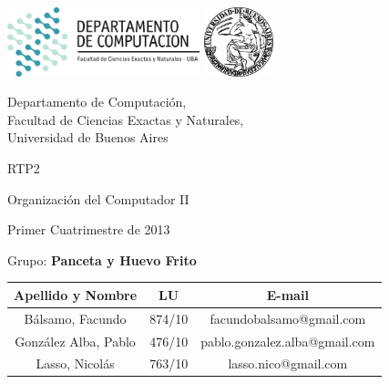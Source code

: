 \documentclass[a4paper,10pt,twoside]{article}
\begin{document}


\thispagestyle{caratula}

\begin{center}

\includegraphics[height=2cm]{DC.png} 
\hfill
\includegraphics[height=2cm]{UBA.jpg} 

\vspace{2cm}

Departamento de Computación,\\
Facultad de Ciencias Exactas y Naturales,\\
Universidad de Buenos Aires

\vspace{4cm}

\begin{Huge}
RTP2
\end{Huge}

\vspace{0.5cm}

\begin{Large}
Organización del Computador II
\end{Large}

\vspace{1cm}

Primer Cuatrimestre de 2013

\vspace{4cm}

Grupo: \textbf{Panceta y Huevo Frito}

\vspace{0.5cm}

\begin{tabular}{|c|c|c|}
\hline
Apellido y Nombre & LU & E-mail\\
\hline
B\'alsamo, Facundo		& 874/10 & facundobalsamo@gmail.com\\
Gonz\'alez Alba, Pablo	& 476/10 & pablo.gonzalez.alba@gmail.com\\
Lasso, Nicol\'as 			& 763/10 & lasso.nico@gmail.com\\
\hline
\end{tabular}

\end{center}
\end{document}

